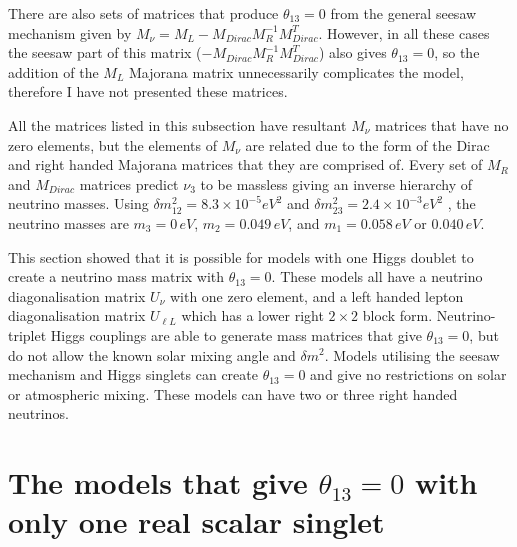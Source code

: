 \documentclass[nofootinbib,showpacs]{revtex4}
\begin{document}
There are also sets of matrices that produce $\theta_{13}=0$ from the general seesaw mechanism given by $M_\nu=M_L-M_{Dirac}M_R^{-1}M_{Dirac}^T$. However, in all these cases the seesaw part of this matrix ($-M_{Dirac}M_R^{-1}M_{Dirac}^T$) also gives $\theta_{13}=0$, so the addition of the $M_L$ Majorana matrix unnecessarily complicates the model, therefore I have not presented these matrices.


All the matrices listed in this subsection have resultant $M_\nu$ matrices that have no zero elements, but the elements of $M_{\nu}$ are related due to the form of the Dirac and right handed Majorana matrices that they are comprised of. 
Every set of $M_R$ and $M_{Dirac}$ matrices predict $\nu_3$ to be massless giving an inverse hierarchy of neutrino masses.
Using $\delta m^2_{12}=8.3 \times 10^{-5} eV^2$ and $\delta m^2_{23}=2.4 \times 10^{-3} eV^2$ \cite{fog04}, the neutrino masses are $m_3=0 \,eV$, $m_2=0.049 \,eV$, and $m_1=0.058 \,eV$ or $0.040\, eV$.


This section showed that it is possible for models with one Higgs doublet to create a neutrino mass matrix with $\theta_{13}=0$.
 These models all have a neutrino diagonalisation matrix $U_\nu$ with one zero element, and a left handed lepton diagonalisation matrix $U_{\ell L}$ which has a lower right $2\times 2$ block form. Neutrino-triplet Higgs couplings are able to generate mass matrices that give $\theta_{13}=0$, but do not allow the known solar mixing angle and $\delta m^2$.
Models utilising the seesaw mechanism and Higgs singlets can create $\theta_{13}=0$ and give no restrictions on solar or atmospheric mixing. These models can have two or three right handed neutrinos.
 





\section{The models that give $\theta_{13}=0$ with only one real scalar singlet}\label{favmodels}
\end{document}
